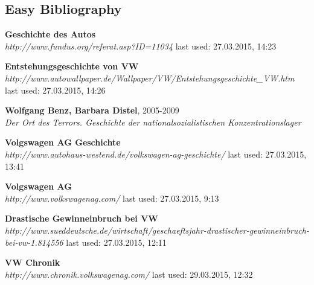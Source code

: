 \documentclass[12pt]{article}
\begin{document}
	\subsection{Easy Bibliography}
	\begin{thebibliography}{56}
		
		
		
		\textbf{Geschichte des Autos} \\
		\textit{
			http://www.fundus.org/referat.asp?ID=11034
		}
		\newline last used: 27.03.2015, 14:23
		
		
		\textbf{Entstehungsgeschichte von VW} \\
		\textit{
			http://www.autowallpaper.de/Wallpaper/VW/Entstehungsgeschichte\_VW.htm
		}
		\newline last used: 27.03.2015, 14:26
		
		\textbf{Wolfgang Benz, Barbara Distel}, 2005-2009 \\
		\textit{
			Der Ort des Terrors. Geschichte der nationalsozialistischen Konzentrationslager
		}
		
		
		\textbf{Volgswagen AG Geschichte} \\
		\textit{
			http://www.autohaus-westend.de/volkswagen-ag-geschichte/
		}
		\newline last used: 27.03.2015, 13:41
		
		\textbf{Volgswagen AG} \\
		\textit{
			http://www.volkswagenag.com/
		}
		\newline last used: 27.03.2015, 9:13
		
		\textbf{Drastische Gewinneinbruch bei VW} \\
		\textit{
			http://www.sueddeutsche.de/wirtschaft/geschaeftsjahr-drastischer-gewinneinbruch-bei-vw-1.814556
		}
		\newline last used: 27.03.2015, 12:11
		
		\textbf{VW Chronik} \\
		\textit{
http://www.chronik.volkswagenag.com/
		}
		\newline last used: 29.03.2015, 12:32
		

		
		
		
	\end{thebibliography}
\end{document}
